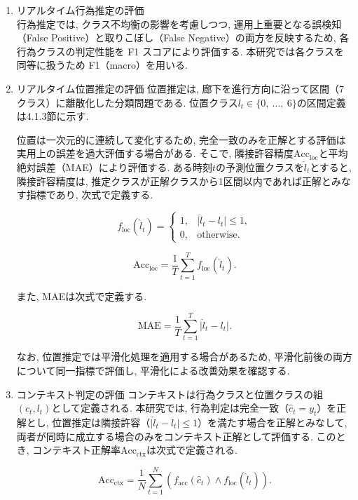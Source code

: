 \documentclass[a4paper,12pt]{jreport}
\begin{document}
\begin{enumerate}[label=(\arabic*)]
  \item リアルタイム行為推定の評価\\
  行為推定では, クラス不均衡の影響を考慮しつつ, 運用上重要となる誤検知（False Positive）と取りこぼし（False Negative）の両方を反映するため, 各行為クラスの判定性能を F1 スコアにより評価する. 本研究では各クラスを同等に扱うため F1（macro）を用いる. 

  \item リアルタイム位置推定の評価
  位置推定は, 廊下を進行方向に沿って区間（7クラス）に離散化した分類問題である. 位置クラス$l_t \in \{0,\ \ldots,\ 6\}$の区間定義は4.1.3節に示す.

位置は一次元的に連続して変化するため, 完全一致のみを正解とする評価は実用上の誤差を過大評価する場合がある. そこで, 隣接許容精度$\mathrm{Acc}_{\mathrm{loc}}$と平均絶対誤差（MAE）により評価する. ある時刻$t$の予測位置クラスを$\hat{l}_t$とすると, 隣接許容精度は, 推定クラスが正解クラスから1区間以内であれば正解とみなす指標であり, 次式で定義する.

\begin{equation}
f_{\mathrm{loc}}(\hat{l}_t)=
\begin{cases}
1, & \lvert \hat{l}_t-l_t\rvert \le 1,\\
0, & \text{otherwise}.
\end{cases}
\end{equation}

\begin{equation}
\mathrm{Acc}_{\mathrm{loc}}=\frac{1}{T}\sum_{t=1}^{T} f_{\mathrm{loc}}(\hat{l}_t).
\end{equation}

また, MAEは次式で定義する.

\begin{equation}
\mathrm{MAE}=\frac{1}{T}\sum_{t=1}^{T} \lvert \hat{l}_t-l_t\rvert .
\end{equation}

なお, 位置推定では平滑化処理を適用する場合があるため, 平滑化前後の両方について同一指標で評価し, 平滑化による改善効果を確認する.

  \item コンテキスト判定の評価
  コンテキストは行為クラスと位置クラスの組$(c_t, l_t)$として定義される. 本研究では, 行為判定は完全一致（$\hat{c}_t=y_t$）を正解とし, 位置推定は隣接許容（$\lvert \hat{l}_t-l_t\rvert \le 1$）を満たす場合を正解とみなして, 両者が同時に成立する場合のみをコンテキスト正解として評価する. このとき, コンテキスト正解率$\mathrm{Acc}_{\mathrm{ctx}}$は次式で定義される.

\begin{equation}
\mathrm{Acc}_{\mathrm{ctx}}=\frac{1}{N}\sum_{t=1}^{N}
\left( f_{\mathrm{acc}}(\hat{c}_t)\land f_{\mathrm{loc}}(\hat{l}_t) \right).
\end{equation}
\end{enumerate}
\end{document}
